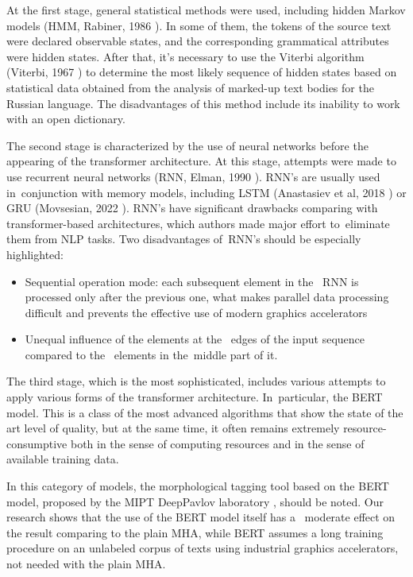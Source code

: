 \documentclass[11pt,twocolumn]{article}
\begin{document}
At the first stage, general statistical methods were used, including hidden Markov models (HMM, Rabiner, 1986 \cite{Rabiner} ). %
In some of them, the tokens of the source text were declared observable states,
and the corresponding grammatical attributes were hidden states.
After that, it's  necessary to use the Viterbi algorithm (Viterbi, 1967 \cite{Viterbi}) to determine the most likely sequence of hidden states based on statistical data obtained from the analysis of marked-up text bodies for the Russian language.
The disadvantages of this method include its inability to work with an open dictionary.

The second stage is characterized by the use of neural networks before the appearing of the transformer architecture.
At this stage, attempts were made to use recurrent neural networks (RNN, Elman, 1990 \cite{Elman}).
RNN's are usually used in~conjunction with memory models,
including LSTM (Anastasiev et al, 2018 \cite{lstm})
or GRU (Movsesian, 2022 \cite{gru}).
RNN's have significant drawbacks comparing with transformer-based architectures,
which authors made major effort to~eliminate them from NLP tasks.
Two disadvantages of~RNN's should be especially highlighted:

\begin{itemize}
\item{Sequential operation mode: each subsequent element in the ~RNN is processed only after the previous one,
what makes parallel data processing difficult and prevents the effective use of modern graphics accelerators}
\item{Unequal influence of the elements at the ~edges of the input sequence compared to the ~elements in the~middle part of it.}
\end{itemize}

The third stage, which is the most sophisticated, includes various attempts to apply various forms of the transformer architecture.
In~particular, the BERT model. This is a class of the most advanced algorithms that show the state of the art level of quality, but at the same time, it often remains extremely resource-consumptive both in the sense of computing resources and in the sense of available training data. %

In this category of models, the morphological tagging tool based on the BERT model, proposed by the MIPT DeepPavlov laboratory \cite{dp}, should be noted.
Our research shows that the use of the BERT model itself  has a~
moderate effect on the result comparing to the plain MHA,
while BERT assumes a long training procedure on an unlabeled corpus of texts using industrial graphics accelerators, not needed with the plain MHA.
\end{document}
